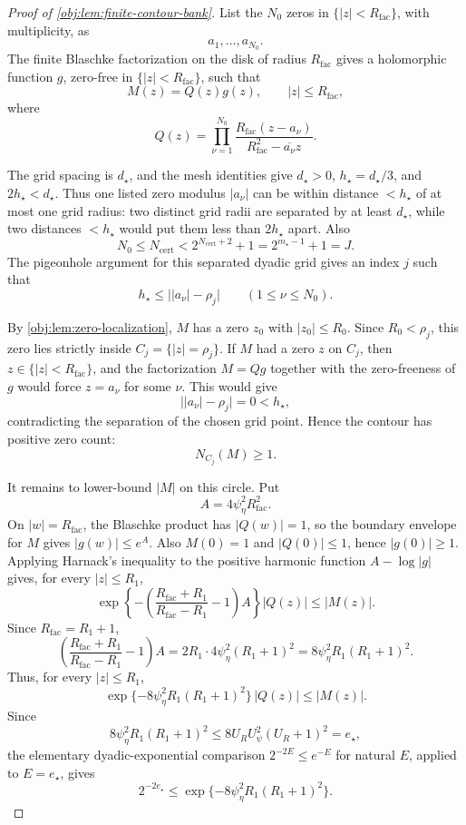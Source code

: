 \documentclass[11pt]{article}
\begin{document}
\begin{proof}[Proof of \cref{obj:lem:finite-contour-bank}]
List the \(N_0\) zeros in \(\{|z|<R_{\mathrm{fac}}\}\), with multiplicity, as
\[
a_1,\ldots,a_{N_0}.
\]
The finite Blaschke factorization on the disk of radius \(R_{\mathrm{fac}}\) gives a holomorphic function \(g\), zero-free in \(\{|z|<R_{\mathrm{fac}}\}\), such that
\[
M(z)=Q(z)g(z),\qquad |z|\le R_{\mathrm{fac}},
\]
where
\[
Q(z)=
\prod_{\nu=1}^{N_0}
\frac{R_{\mathrm{fac}}(z-a_\nu)}
     {R_{\mathrm{fac}}^2-\overline{a_\nu}z}.
\]

The grid spacing is \(d_\star\), and the mesh identities give \(d_\star>0\), \(h_\star=d_\star/3\), and \(2h_\star<d_\star\).  Thus one listed zero modulus \(|a_\nu|\) can be within distance \(<h_\star\) of at most one grid radius: two distinct grid radii are separated by at least \(d_\star\), while two distances \(<h_\star\) would put them less than \(2h_\star\) apart.  Also
\[
N_0\le N_{\mathrm{cert}}<2^{N_{\mathrm{cert}}+2}+1
=2^{m_\star-1}+1=J.
\]
The pigeonhole argument for this separated dyadic grid gives an index \(j\) such that
\[
h_\star\le \bigl||a_\nu|-\rho_j\bigr|
\qquad (1\le \nu\le N_0).
\]

By \cref{obj:lem:zero-localization}, \(M\) has a zero \(z_0\) with \(|z_0|\le R_0\).  Since \(R_0<\rho_j\), this zero lies strictly inside \(C_j=\{|z|=\rho_j\}\).  If \(M\) had a zero \(z\) on \(C_j\), then \(z\in\{|z|<R_{\mathrm{fac}}\}\), and the factorization \(M=Qg\) together with the zero-freeness of \(g\) would force \(z=a_\nu\) for some \(\nu\).  This would give
\[
\bigl||a_\nu|-\rho_j\bigr|=0<h_\star,
\]
contradicting the separation of the chosen grid point.  Hence the contour has positive zero count:
\[
N_{C_j}(M)\ge1.
\]

It remains to lower-bound \(|M|\) on this circle.  Put
\[
A=4\psi_\eta^2R_{\mathrm{fac}}^2.
\]
On \(|w|=R_{\mathrm{fac}}\), the Blaschke product has \(|Q(w)|=1\), so the boundary envelope for \(M\) gives \(|g(w)|\le e^A\).  Also \(M(0)=1\) and \(|Q(0)|\le1\), hence \(|g(0)|\ge1\).  Applying Harnack's inequality to the positive harmonic function \(A-\log|g|\) gives, for every \(|z|\le R_1\),
\[
\exp\!\left\{-\left(\frac{R_{\mathrm{fac}}+R_1}{R_{\mathrm{fac}}-R_1}-1\right)A\right\}|Q(z)|
\le |M(z)|.
\]
Since \(R_{\mathrm{fac}}=R_1+1\),
\[
\left(\frac{R_{\mathrm{fac}}+R_1}{R_{\mathrm{fac}}-R_1}-1\right)A
=2R_1\cdot 4\psi_\eta^2(R_1+1)^2
=8\psi_\eta^2R_1(R_1+1)^2.
\]
Thus, for every \(|z|\le R_1\),
\[
\exp\{-8\psi_\eta^2R_1(R_1+1)^2\}\,|Q(z)|
\le |M(z)|.
\]
Since
\[
8\psi_\eta^2R_1(R_1+1)^2\le
8U_RU_\psi^2(U_R+1)^2=e_\star,
\]
the elementary dyadic-exponential comparison \(2^{-2E}\le e^{-E}\) for natural \(E\), applied to \(E=e_\star\), gives
\[
2^{-2e_\star}
\le \exp\{-8\psi_\eta^2R_1(R_1+1)^2\}.
\]


\end{proof}
\end{document}
